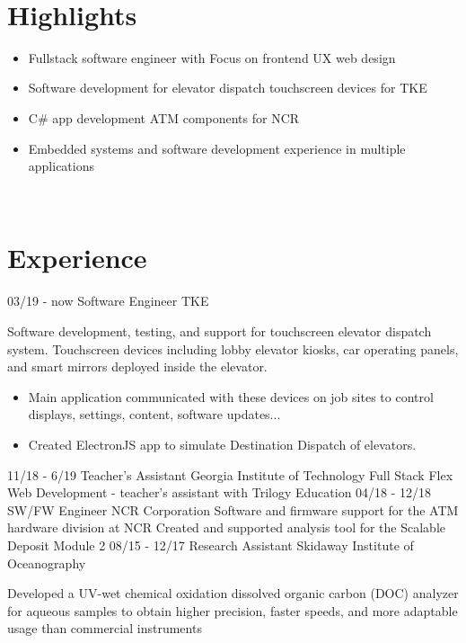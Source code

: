 \documentclass[]{resume}
\begin{document}
\begin{body}
    ~
	\section{Highlights}
    	\begin{itemize}
    		\item {Fullstack software engineer with Focus on frontend UX web design}
    		\item {Software development for elevator dispatch touchscreen devices for TKE}
    		\item {C\# app development ATM components for NCR}
    		\item {Embedded systems and software development experience in multiple applications}
    	\end{itemize}
	~
	\section{Experience}
    	\begin{entrylist}
    		\entry 
    		{03/19 - now}
    		{Software Engineer}
    		{TKE}
    		{Software development, testing, and support for touchscreen elevator dispatch system. Touchscreen devices including lobby elevator kiosks, car operating panels, and smart mirrors deployed inside the elevator.
    			\begin{itemize}
    				\item Main application communicated with these devices on job sites to control displays, settings, content, software updates... 
    				\item Created ElectronJS app to simulate Destination Dispatch of elevators.
    			\end{itemize}
    		}
    		\entry 
    		{11/18 - 6/19}
    		{Teacher's Assistant}
    		{Georgia Institute of Technology}
    		{Full Stack Flex Web Development - teacher's assistant with Trilogy Education}
    		\entry
    		{04/18 - 12/18}
    		{SW/FW Engineer}
    		{NCR Corporation}
    		{Software and firmware support for the ATM hardware division at NCR 
    			\newline
    		Created and supported analysis tool for the Scalable Deposit Module 2}
    		\entry
    		{08/15 - 12/17}
    		{Research Assistant}
    		{Skidaway Institute of Oceanography}
    		{Developed a UV-wet chemical oxidation dissolved organic carbon (DOC) analyzer for aqueous samples to obtain higher precision, faster speeds, and more adaptable usage than commercial instruments
    			\begin{itemize}

\end{itemize}}
\end{entrylist}
\end{body}
\end{document}
